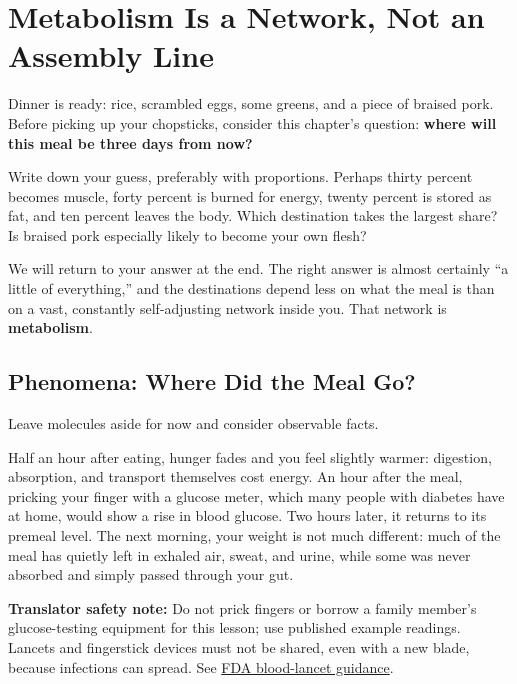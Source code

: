 \chapter{Metabolism Is a Network, Not an Assembly Line}

\begin{kaichang}
Dinner is ready: rice, scrambled eggs, some greens, and a piece of braised pork. Before picking up your chopsticks, consider this chapter's question: \textbf{where will this meal be three days from now?}

Write down your guess, preferably with proportions. Perhaps thirty percent becomes muscle, forty percent is burned for energy, twenty percent is stored as fat, and ten percent leaves the body. Which destination takes the largest share? Is braised pork especially likely to become your own flesh?

We will return to your answer at the end. The right answer is almost certainly ``a little of everything,'' and the destinations depend less on what the meal is than on a vast, constantly self-adjusting network inside you. That network is \textbf{metabolism}.
\end{kaichang}

\section{Phenomena: Where Did the Meal Go?}

Leave molecules aside for now and consider observable facts.

Half an hour after eating, hunger fades and you feel slightly warmer: digestion, absorption, and transport themselves cost energy. An hour after the meal, pricking your finger with a glucose meter, which many people with diabetes have at home, would show a rise in blood glucose. Two hours later, it returns to its premeal level. The next morning, your weight is not much different: much of the meal has quietly left in exhaled air, sweat, and urine, while some was never absorbed and simply passed through your gut.

\textbf{Translator safety note:} Do not prick fingers or borrow a family member's glucose-testing equipment for this lesson; use published example readings. Lancets and fingerstick devices must not be shared, even with a new blade, because infections can spread. See \href{https://www.fda.gov/regulatory-information/search-fda-guidance-documents/blood-lancet-labeling-guidance-industry-and-food-and-drug-administration-staff}{FDA blood-lancet guidance}.

